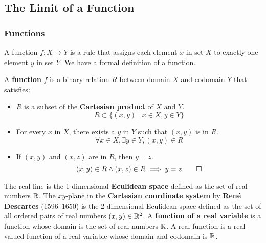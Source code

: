 \subsection{The Limit of a Function}

\subsubsection{Functions}
A function \(f:X\mapsto Y\) is a rule that assigns each element \(x\) in set
\(X\) to exactly one element \(y\) in set \(Y\).
We have a formal definition of a function.
\begin{definition}
    A \textbf{function} \(f\) is a binary relation \(R\) between domain \(X\)
    and codomain \(Y\) that satisfies:
    \begin{itemize}
        \item \(R\) is a subset of the \textbf{Cartesian product} of \(X\) and \(Y\).
        \[R\subset\{(x,y)\mid x\in X,y\in Y\}\]
        \item For every \(x\) in \(X\), there exists a \(y\) in \(Y\) such
        that \((x,y)\) is in \(R\).
        \[\forall x\in X,\exists y\in Y,(x,y)\in R\]
        \item If \((x,y)\) and \((x,z)\) are in \(R\), then \(y=z\).
        \[(x,y)\in R \wedge (x,z)\in R \implies y=z\qedhere\]
    \end{itemize}
\end{definition}
The real line is the 1-dimensional \textbf{Eculidean space} defined as the set
of real numbers \(\mathbb{R}\).
The \(xy\)-plane in the \textbf{Cartesian coordinate system} by
\textbf{René Descartes} (1596--1650) is the 2-dimensional Eculidean space defined
as the set of all ordered pairs of real numbers \((x,y)\in\mathbb{R}^2\).
A \textbf{function of a real variable} is a function whose domain is the set
of real numbers \(\mathbb{R}\). A real function is a real-valued function of a real
variable whose domain and codomain is \(\mathbb{R}\).

